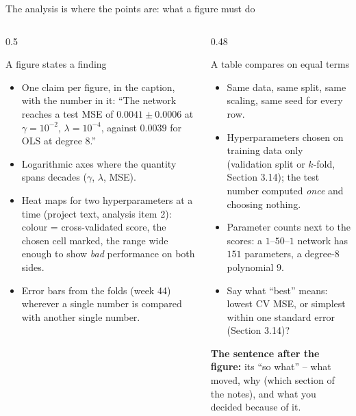 \documentclass[10pt,aspectratio=169]{beamer}
\begin{document}
\begin{frame}{The analysis is where the points are: what a figure must do}
\footnotesize
\vspace{-8pt}
\begin{columns}[T]
\begin{column}{0.5\textwidth}
\begin{block}{A figure states a finding}
\begin{itemize}
  \item One claim per figure, in the caption, with the number in it:
        ``The network reaches a test MSE of $0.0041\pm0.0006$ at
        $\gamma=10^{-2}$, $\lambda=10^{-4}$, against $0.0039$ for OLS at
        degree 8.''
  \item Logarithmic axes where the quantity spans decades ($\gamma$,
        $\lambda$, MSE).
  \item Heat maps for two hyperparameters at a time (project text, analysis
        item 2): colour = cross-validated score, the chosen cell marked,
        the range wide enough to show \emph{bad} performance on both sides.
  \item Error bars from the folds (week 44) wherever a single number is
        compared with another single number.
\end{itemize}
\end{block}
\end{column}
\begin{column}{0.48\textwidth}
\begin{block}{A table compares on equal terms}
\begin{itemize}
  \item Same data, same split, same scaling, same seed for every row.
  \item Hyperparameters chosen on training data only (validation split or
        $k$-fold, Section 3.14); the test number computed \emph{once} and
        choosing nothing.
  \item Parameter counts next to the scores: a $1$--$50$--$1$ network has
        $151$ parameters, a degree-8 polynomial $9$.
  \item Say what ``best'' means: lowest CV MSE, or simplest within one
        standard error (Section 3.14)?
\end{itemize}
\end{block}
\medskip
\textbf{The sentence after the figure:} its ``so what'' -- what moved, why
(which section of the notes), and what you decided because of it.
\end{column}
\end{columns}
\end{frame}
\end{document}
